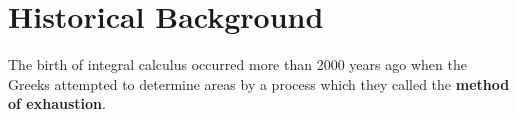 \section{Historical Background}\label{0:sec:1.2}

\begin{note}
  The birth of integral calculus occurred more than 2000 years ago when the Greeks attempted to determine areas by a process which they called the \textbf{method of exhaustion}.

\end{note}
